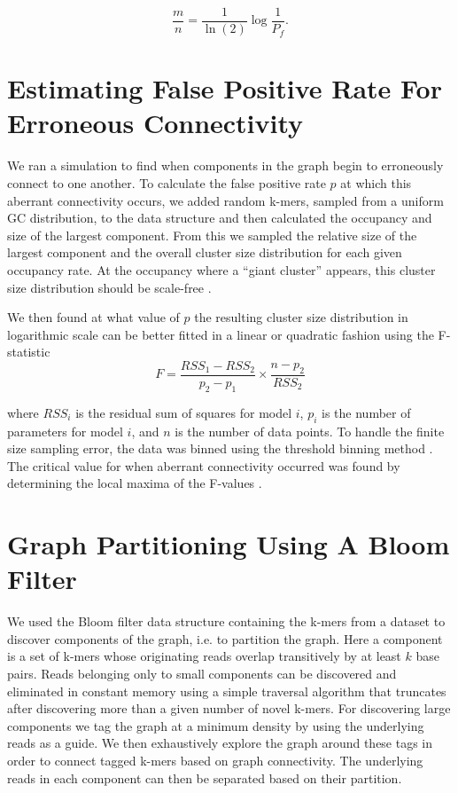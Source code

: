 \documentclass{pnastwo}
\begin{document}
\begin{article}
\begin{materials}
\begin{displaymath}
\frac{m}{n} = \frac{1}{\ln(2)} \log{\frac{1}{P_f}}.
\end{displaymath}

\section{Estimating False Positive Rate For Erroneous Connectivity}
We ran a simulation to find when components in the graph 
begin to erroneously connect to one another.
To calculate the false positive rate $p$ at which this aberrant 
connectivity occurs, 
we added random k-mers, sampled from a uniform GC distribution, to the data structure 
and then calculated the occupancy and size of 
the largest 
component. From this we sampled the relative size of 
the largest component and the overall cluster size distribution for each
given occupancy rate.
At the occupancy where a ``giant cluster'' appears, this cluster size distribution 
should be scale-free \cite{stauffer1979scaling}. 

We then found at what value of $p$ the resulting 
cluster size distribution in logarithmic 
scale can be better fitted in a linear or quadratic fashion using 
the F-statistic
\newline
\newline
\begin{displaymath}
F=\frac{RSS_1-RSS_2}{p_2-p_1} \times \frac{n - p_2}{RSS_2}
\end{displaymath}

where $RSS_i$ is the residual sum of squares for model $i$, $p_i$ is 
the number of parameters for model $i$, and $n$ is the number of data 
points. To handle the finite size sampling error, the data was binned using the 
threshold binning method \cite{adami2002critical}. The critical value for 
when aberrant connectivity occurred was found by determining the local maxima 
of the F-values \cite{wald43}.

\section{Graph Partitioning Using A Bloom Filter}

We used the Bloom filter data structure containing the k-mers from a
dataset to discover components of the graph, i.e. to partition the
graph.  Here a component is a set of k-mers whose originating reads
overlap transitively by at least $k$ base pairs.  Reads belonging only
to small components can be discovered and eliminated in constant
memory using a simple traversal algorithm that truncates after
discovering more than a given number of novel k-mers.  For discovering
large components we tag the graph at a minimum density by using the
underlying reads as a guide.  We then exhaustively explore the graph
around these tags in order to connect tagged k-mers based on graph
connectivity.  The underlying reads in each component can then be
separated based on their partition.


\end{materials}
\end{article}
\end{document}
